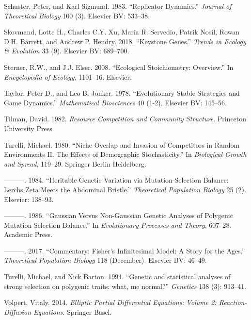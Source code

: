 \documentclass[]{article}
\begin{document}
\leavevmode\hypertarget{ref-Schuster1983}{}%
Schuster, Peter, and Karl Sigmund. 1983. ``Replicator Dynamics.''
\emph{Journal of Theoretical Biology} 100 (3). Elsevier BV: 533--38.

\leavevmode\hypertarget{ref-Skovmand2018}{}%
Skovmand, Lotte H., Charles C.Y. Xu, Maria R. Servedio, Patrik Nosil,
Rowan D.H. Barrett, and Andrew P. Hendry. 2018. ``Keystone Genes.''
\emph{Trends in Ecology \& Evolution} 33 (9). Elsevier BV: 689--700.

\leavevmode\hypertarget{ref-Sterner2008}{}%
Sterner, R.W., and J.J. Elser. 2008. ``Ecological Stoichiometry:
Overview.'' In \emph{Encyclopedia of Ecology}, 1101--16. Elsevier.

\leavevmode\hypertarget{ref-Taylor1978}{}%
Taylor, Peter D., and Leo B. Jonker. 1978. ``Evolutionary Stable
Strategies and Game Dynamics.'' \emph{Mathematical Biosciences} 40
(1-2). Elsevier BV: 145--56.

\leavevmode\hypertarget{ref-davidtilman1982}{}%
Tilman, David. 1982. \emph{Resource Competition and Community
Structure}. Princeton University Press.

\leavevmode\hypertarget{ref-Turelli1980}{}%
Turelli, Michael. 1980. ``Niche Overlap and Invasion of Competitors in
Random Environments II. The Effects of Demographic Stochasticity.'' In
\emph{Biological Growth and Spread}, 119--29. Springer Berlin
Heidelberg.

\leavevmode\hypertarget{ref-Turelli1984}{}%
---------. 1984. ``Heritable Genetic Variation via Mutation-Selection
Balance: Lerchs Zeta Meets the Abdominal Bristle.'' \emph{Theoretical
Population Biology} 25 (2). Elsevier: 138--93.

\leavevmode\hypertarget{ref-Turelli1986}{}%
---------. 1986. ``Gaussian Versus Non-Gaussian Genetic Analyses of
Polygenic Mutation-Selection Balance.'' In \emph{Evolutionary Processes
and Theory}, 607--28. Academic Press.

\leavevmode\hypertarget{ref-Turelli2017}{}%
---------. 2017. ``Commentary: Fisher's Infinitesimal Model: A Story for
the Ages.'' \emph{Theoretical Population Biology} 118 (December).
Elsevier BV: 46--49.

\leavevmode\hypertarget{ref-pmid7851785}{}%
Turelli, Michael, and Nick Barton. 1994. ``Genetic and statistical
analyses of strong selection on polygenic traits: what, me normal?''
\emph{Genetics} 138 (3): 913--41.

\leavevmode\hypertarget{ref-Volpert2014}{}%
Volpert, Vitaly. 2014. \emph{Elliptic Partial Differential Equations:
Volume 2: Reaction-Diffusion Equations}. Springer Basel.
\end{document}
